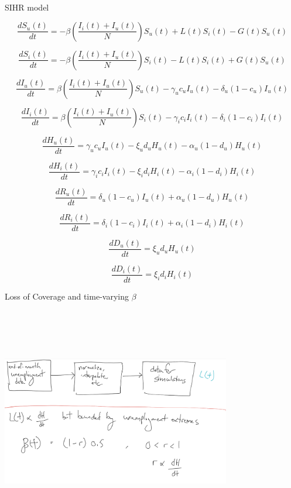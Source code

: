 \documentclass[notes]{beamer}
\begin{document}
\begin{frame}[shrink=25]{SIHR model}





$$\frac{dS_u(t)}{dt} = -\beta\left(\frac{I_i(t) + I_u(t)}{N}\right)S_u(t) + L(t) S_i(t) - G(t) S_u(t)$$

$$\frac{dS_i(t)}{dt} = -\beta\left(\frac{I_i(t) + I_u(t)}{N}\right)S_i(t) - L(t) S_i(t) +  G(t) S_u(t)$$

$$\frac{dI_u(t)}{dt} = \beta\left(\frac{I_i(t) + I_u(t)}{N}\right)S_u(t) - 
\gamma_u c_u I_u(t) - \delta_u (1-c_u) I_u(t)$$

$$\frac{dI_i(t)}{dt} = \beta\left(\frac{I_i(t) + I_u(t)}{N}\right)S_i(t) - 
\gamma_i c_i I_i(t) - \delta_i (1-c_i) I_i(t)$$

$$\frac{dH_u(t)}{dt} =   
\gamma_u c_u I_u(t) - \xi_u d_u H_u(t) - \alpha_u (1-d_u)H_u(t)$$

$$\frac{dH_i(t)}{dt} =   
\gamma_i c_i I_i(t) - \xi_i d_i H_i(t) - \alpha_i (1-d_i)H_i(t)$$

$$\frac{dR_u(t)}{dt} = \delta_u (1-c_u) I_u(t) + \alpha_u (1-d_u)H_u(t)$$

$$\frac{dR_i(t)}{dt} = \delta_i (1-c_i) I_i(t) + \alpha_i (1-d_i)H_i(t)$$

$$\frac{dD_u(t)}{dt} =  \xi_u d_u H_u(t)$$

$$\frac{dD_i(t)}{dt} = \xi_i d_i H_i(t)$$






\end{frame}



\begin{frame}{Loss of Coverage and time-varying $\beta$}



\includegraphics[width=10cm,height=10cm,keepaspectratio]{loss_and_beta.png}




\end{frame}
\end{document}
